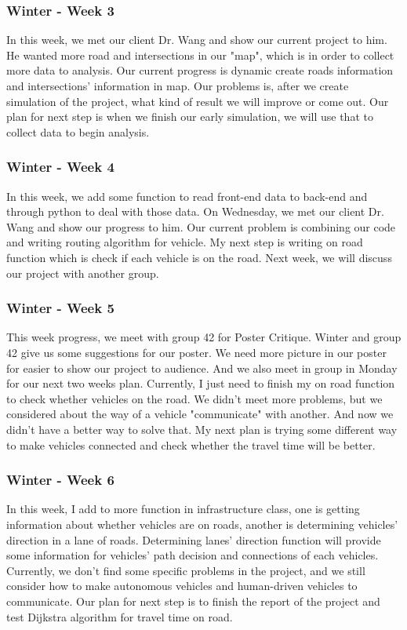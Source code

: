 \documentclass[onecolumn, draftclsnofoot,10pt, compsoc]{IEEEtran}
\begin{document}
\subsubsection{Winter - Week 3}
In this week, we met our client Dr. Wang and show our current project to him.
He wanted more road and intersections in our "map", which is in order to collect more data to analysis.
Our current progress is dynamic create roads information and intersections' information in map.
Our problems is, after we create simulation of the project, what kind of result we will improve or come out.
Our plan for next step is when we finish our early simulation, we will use that to collect data to begin analysis.
\subsubsection{Winter - Week 4}
In this week, we add some function to read front-end data to back-end and through python to deal with those data.
On Wednesday, we met our client Dr. Wang and show our progress to him.
Our current problem is combining our code and writing routing algorithm for vehicle.
My next step is writing on road function which is check if each vehicle is on the road.
Next week, we will discuss our project with another group.
\subsubsection{Winter - Week 5}
This week progress, we meet with group 42 for Poster Critique.
Winter and group 42 give us some suggestions for our poster.
We need more picture in our poster for easier to show our project to audience.
And we also meet in group in Monday for our next two weeks plan.
Currently, I just need to finish my on road function to check whether vehicles on the road.
We didn't meet more problems, but we considered about the way of a vehicle "communicate" with another.
And now we didn't have a better way to solve that.
My next plan is trying some different way to make vehicles connected and check whether the travel time will be better.
\subsubsection{Winter - Week 6}
In this week, I add to more function in infrastructure class, one is getting information about whether vehicles are on roads, another is determining vehicles' direction in a lane of roads.
Determining lanes' direction function will provide some information for vehicles' path decision and connections of each vehicles.
Currently, we don't find some specific problems in the project, and we still consider how to make autonomous vehicles and human-driven vehicles to communicate.
Our plan for next step is to finish the report of the project and test Dijkstra algorithm for travel time on road.
\end{document}
